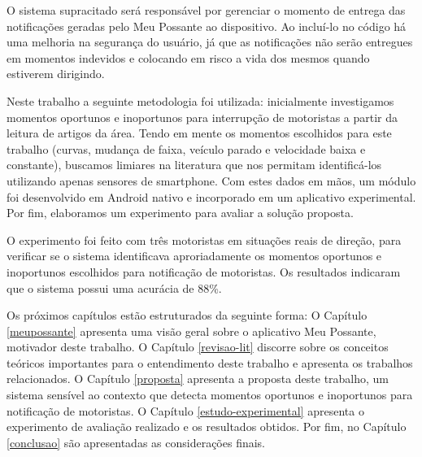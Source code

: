 O sistema supracitado será responsável por gerenciar o momento de entrega das notificações geradas pelo Meu Possante ao dispositivo. Ao
incluí-lo no código há uma melhoria na segurança do usuário, já que as notificações não serão entregues em momentos indevidos e
colocando em risco a vida dos mesmos quando estiverem dirigindo.

Neste trabalho a seguinte metodologia foi utilizada: inicialmente investigamos momentos oportunos e inoportunos para interrupção de motoristas
a partir da leitura de artigos da área. Tendo em mente os momentos escolhidos para este trabalho (curvas, mudança de faixa, veículo parado e
velocidade baixa e constante), buscamos limiares na literatura que nos permitam identificá-los utilizando apenas sensores de smartphone.
Com estes dados em mãos, um módulo foi desenvolvido em Android nativo e incorporado em um aplicativo experimental. Por fim, elaboramos um
experimento para avaliar a solução proposta.

O experimento foi feito com três motoristas em situações reais de direção, para verificar se o sistema identificava aproriadamente os momentos
oportunos e inoportunos escolhidos para notificação de motoristas. Os resultados indicaram que o sistema possui uma acurácia de 88\%.

Os próximos capítulos estão estruturados da seguinte forma: O Capítulo \ref{meupossante} apresenta uma visão geral sobre o aplicativo Meu Possante,
motivador deste trabalho. O Capítulo \ref{revisao-lit} discorre sobre os conceitos teóricos importantes para o entendimento deste trabalho e
apresenta os trabalhos relacionados. O Capítulo \ref{proposta} apresenta a proposta deste trabalho, um sistema sensível ao contexto que detecta
momentos oportunos e inoportunos para notificação de motoristas. O Capítulo \ref{estudo-experimental} apresenta o experimento de avaliação realizado e
os resultados obtidos. Por fim, no Capítulo \ref{conclusao} são apresentadas as considerações finais.
